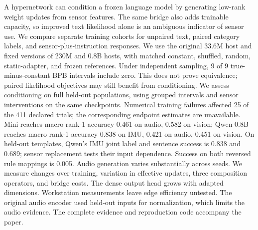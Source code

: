 A hypernetwork can condition a frozen language model by generating low-rank weight updates from sensor features. The same bridge also adds trainable capacity, so improved text likelihood alone is an ambiguous indicator of sensor use. We compare separate training cohorts for unpaired text, paired category labels, and sensor-plus-instruction responses. We use the original 33.6M host and fixed versions of 230M and 0.8B hosts, with matched constant, shuffled, random, static-adapter, and frozen references. Under independent sampling, 9 of 9 true-minus-constant BPB intervals include zero. This does not prove equivalence; paired likelihood objectives may still benefit from conditioning. We assess conditioning on full held-out populations, using grouped intervals and sensor interventions on the same checkpoints. Numerical training failures affected 25 of the 411 declared trials; the corresponding endpoint estimates are unavailable. Mini reaches macro rank-1 accuracy 0.461 on audio, 0.582 on vision; Qwen 0.8B reaches macro rank-1 accuracy 0.838 on IMU, 0.421 on audio, 0.451 on vision. On held-out templates, Qwen's IMU joint label and sentence success is 0.838 and 0.689; sensor replacement tests their input dependence. Success on both reversed rule mappings is 0.005. Audio generation varies substantially across seeds. We measure changes over training, variation in effective updates, three composition operators, and bridge costs. The dense output head grows with adapted dimensions. Workstation measurements leave edge efficiency untested. The original audio encoder used held-out inputs for normalization, which limits the audio evidence. The complete evidence and reproduction code accompany the paper.

